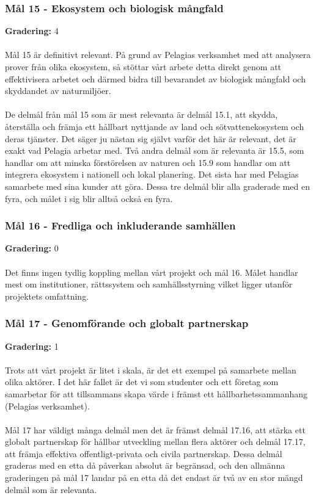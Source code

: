 \subsubsection{Mål 15 - Ekosystem och biologisk mångfald}
\textbf{Gradering:} 4 
\\\\
Mål 15 är definitivt relevant. På grund av Pelagias verksamhet med att analysera prover från olika ekosystem, så stöttar vårt arbete detta direkt genom att effektivisera arbetet och därmed bidra till bevarandet av biologisk mångfald och skyddandet av naturmiljöer.
\\\\
De delmål från mål 15 som är mest relevanta är delmål 15.1, att skydda, återställa och främja ett hållbart nyttjande av land och sötvattenekosystem och deras tjänster. Det säger ju nästan sig självt varför det här är relevant, det är exakt vad Pelagia arbetar med. Två andra delmål som är relevanta är 15.5, som handlar om att minska förstörelsen av naturen och 15.9 som handlar om att integrera ekosystem i nationell och lokal planering. Det sista har med Pelagias samarbete med sina kunder att göra. Dessa tre delmål blir alla graderade med en fyra, och målet i sig blir alltså också en fyra.

\subsubsection{Mål 16 - Fredliga och inkluderande samhällen}
\textbf{Gradering:} 0 
\\\\
Det finns ingen tydlig koppling mellan vårt projekt och mål 16. Målet handlar mest om institutioner, rättssystem och samhällsstyrning vilket ligger utanför projektets omfattning.

\subsubsection{Mål 17 - Genomförande och globalt partnerskap}
\textbf{Gradering:} 1 
\\\\
Trots att vårt projekt är litet i skala, är det ett exempel på samarbete mellan olika aktörer. I det här fallet är det vi som studenter och ett företag som samarbetar för att tillsammans skapa värde i främst ett hållbarhetssammanhang (Pelagias verksamhet).
\\\\
Mål 17 har väldigt många delmål men det är främst delmål 17.16, att stärka ett globalt partnerskap för hållbar utveckling mellan flera aktörer och delmål 17.17, att främja effektiva offentligt-privata och civila partnerskap. Dessa delmål graderas med en etta då påverkan absolut är begränsad, och den allmänna graderingen på mål 17 landar på en etta då det endast är två av en stor mängd delmål som är relevanta.
